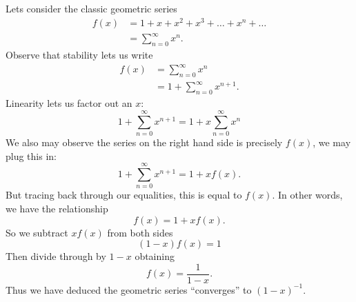 \begin{ex}
Lets consider the classic geometric series
\begin{equation}
\begin{split}
f(x) &= 1 + x + x^{2} + x^{3} + \dots + x^{n} + \dots \\
&=\sum^{\infty}_{n=0}x^{n}.
\end{split}
\end{equation}
Observe that stability lets us write
\begin{equation}
\begin{split}
f(x) &= \sum_{n=0}^{\infty}x^{n}\\
&= 1 + \sum^{\infty}_{n=0}x^{n+1}.
\end{split}
\end{equation}
Linearity lets us factor out an $x$:
\begin{equation}
1+\sum^{\infty}_{n=0}x^{n+1} = 1+x\sum^{\infty}_{n=0}x^{n}
\end{equation}
We also may observe the series on the right hand side is
precisely $f(x)$, we may plug this in:
\begin{equation}
1+\sum^{\infty}_{n=0}x^{n+1} = 1+xf(x).
\end{equation}
But tracing back through our equalities, this is equal to
$f(x)$. In other words, we have the relationship
\begin{equation}
f(x) = 1 + xf(x).
\end{equation}
So we subtract $xf(x)$ from both sides
\begin{equation}
(1-x)f(x) = 1
\end{equation}
Then divide through by $1-x$ obtaining
\begin{equation}
f(x)=\frac{1}{1-x}.
\end{equation}
Thus we have deduced the geometric series ``converges'' to $(1-x)^{-1}$.
\end{ex}
